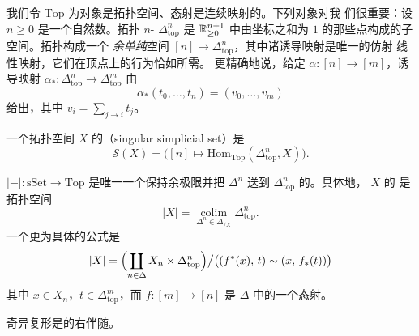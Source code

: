 \begin{definition}\label{def:top}
我们令 $\mathrm{Top}$ 为对象是拓扑空间、态射是连续映射的\trCategory{}。下列对象对我
们很重要：设 $n \ge 0$ 是一个自然数。拓扑 $n$-\trSimplex{} $\Delta^n_{\mathrm{top}}$ 是
$\mathbb{R}^{n+1}_{\ge 0}$ 中由坐标之和为 $1$ 的那些点构成的子空间。拓扑\trSimplex{}构成一个
\emph{余单纯}空间 $[n] \mapsto \Delta^n_{\mathrm{top}}$，其中诸诱导映射是唯一的仿射
线性映射，它们在顶点上的行为恰如所需。
更精确地说，给定 $\alpha\colon [n] \to [m]$，诱导映射
$\alpha_*\colon \Delta^n_{\mathrm{top}} \to \Delta^m_{\mathrm{top}}$ 由
\[
\alpha_*(t_0, \dots, t_n) = (v_0, \dots, v_m)
\]
给出，其中 $v_i = \sum_{j \to i} t_j$。
\end{definition}

\begin{definition}\label{def:singular-simplicial-set}
一个拓扑空间 $X$ 的\emph{\trSingularSimplicialSet{}}（singular simplicial set）是\trSimplicialSet{}%
\[
\mathcal{S}(X) = \bigl([n] \mapsto
\mathrm{Hom}_{\mathrm{Top}}(\Delta^n_{\mathrm{top}}, X)\bigr).
\]
\end{definition}

\begin{definition}\label{def:geometric-realization}
\trGeometricRealization{} $|-|\colon \mathrm{sSet} \to \mathrm{Top}$ 是唯一一个保持余极限并把
$\Delta^n$ 送到 $\Delta^n_{\mathrm{top}}$ 的\trFunctor{}。具体地，\trSimplicialSet{} $X$ 的%
\trGeometricRealization{}是拓扑空间
\[
|X| = \operatorname*{colim}_{\Delta^n \in \Delta_{/X}} \Delta^n_{\mathrm{top}}.
\]
一个更为具体的公式是
\[
|X| = \Bigl( \coprod_{n \in \Delta} X_n \times \Delta^n_{\mathrm{top}} \Bigr)
\big/ \bigl( (f^*(x),\, t) \sim (x,\, f_*(t)) \bigr)
\]
其中 $x \in X_n$，$t \in \Delta^m_{\mathrm{top}}$，而 $f\colon [m] \to [n]$ 是
$\Delta$ 中的一个态射。
\end{definition}

\begin{proposition}\label{prop:singular-right-adjoint}
奇异复形是\trGeometricRealization{}的右伴随。
\end{proposition}

